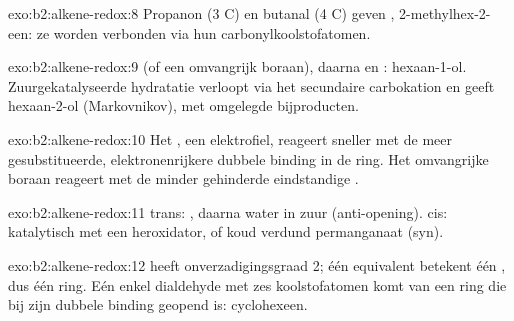 \begin{solution}{exo:b2:alkene-redox:8}
Propanon (3 C) en butanal (4 C) geven ,
2-methylhex-2-een: ze worden verbonden via hun carbonylkoolstofatomen.
\end{solution}

\begin{solution}{exo:b2:alkene-redox:9}
 (of een omvangrijk boraan), daarna  en : hexaan-1-ol. Zuurgekatalyseerde hydratatie
verloopt via het secundaire carbokation en geeft hexaan-2-ol (Markovnikov), met
omgelegde bijproducten.
\end{solution}

\begin{solution}{exo:b2:alkene-redox:10}
Het , een elektrofiel, reageert sneller met de meer gesubstitueerde, elektronenrijkere
dubbele binding in de ring. Het omvangrijke boraan reageert met de minder gehinderde eindstandige .
\end{solution}

\begin{solution}{exo:b2:alkene-redox:11}
trans: , daarna water in zuur (anti-opening). cis: katalytisch  met een
heroxidator, of koud verdund permanganaat (syn).
\end{solution}

\begin{solution}{exo:b2:alkene-redox:12}
 heeft onverzadigingsgraad 2; één equivalent  betekent één , dus
één ring. Eén enkel dialdehyde met zes koolstofatomen komt van een ring die bij zijn dubbele binding geopend is:
cyclohexeen.
\end{solution}

